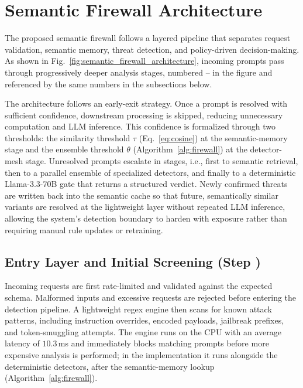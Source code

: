 \documentclass[runningheads]{llncs}
\newif\ifrev
\newcommand{\rev}[1]{\ifrev\hl{#1}\else#1\fi}                  %
\begin{document}
\section{Semantic Firewall Architecture}\label{sec:firewall_arch}
The proposed semantic firewall follows a layered pipeline that separates request validation, semantic memory, threat detection, and policy-driven decision-making. As shown in Fig.~\ref{fig:semantic_firewall_architecture}, incoming prompts pass through progressively deeper analysis stages, numbered -- in the figure and referenced by the same numbers in the subsections below.

The architecture follows an early-exit strategy. Once a prompt is resolved with sufficient confidence, downstream processing is skipped, reducing unnecessary computation and LLM inference. This confidence is formalized through two thresholds: the similarity threshold 
$\tau$ (Eq.~\eqref{eq:cosine}) at the semantic-memory stage and the \rev{ensemble} threshold $\theta$ (Algorithm~\ref{alg:firewall}) at the detector-mesh stage. Unresolved prompts escalate in stages, i.e., first to semantic retrieval, then to a parallel ensemble of specialized detectors, and finally to a deterministic Llama-3.3-70B gate that returns a structured verdict. Newly confirmed threats are written back into \rev{the} semantic cache so that future, semantically similar variants are resolved at the lightweight layer without repeated LLM inference, allowing the system's detection boundary to harden with exposure rather than requiring manual rule updates or retraining.

\subsection{Entry Layer and Initial Screening (Step )}
Incoming requests are first rate-limited and validated against the
expected schema. Malformed inputs and excessive requests are rejected before entering the detection pipeline. A lightweight regex engine then scans for known attack patterns, including instruction overrides, encoded payloads, jailbreak prefixes, and token-smuggling attempts. The engine runs on the CPU with an average latency of \rev{$10.3$\,ms} and immediately blocks matching prompts before more expensive analysis is performed\rev{; in the implementation it runs alongside the deterministic detectors, after the semantic-memory lookup (Algorithm~\ref{alg:firewall})}.
\end{document}
